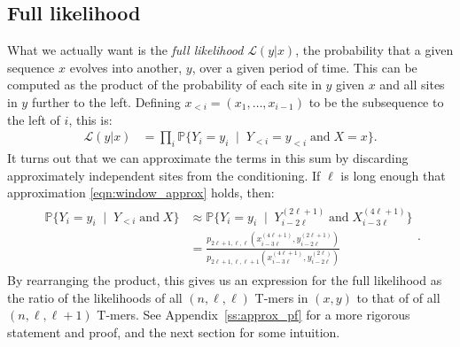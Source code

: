 \documentclass{article}
\renewcommand{\P}{\mathbb{P}}
\newcommand{\calS}{\mathcal{S}}  %
\newcommand{\given}{\;\mid\;}
\newcommand{\like}{\mathcal L}
\theoremstyle{plain}
\theoremstyle{definition}
\begin{document}

\subsection{Full likelihood}

What we actually want is the \emph{full likelihood} $\like(y|x)$,
the probability that a given sequence $x$ evolves into another, $y$, over a given period of time.
This can be computed as the product of the probability of each site in $y$
given $x$ and all sites in $y$ further to the left.
Defining $x_{<i}=(x_1, \ldots, x_{i-1})$ to be the subsequence to the left of $i$, this is:
\begin{align*}
    \like(y|x) &= \prod_i \P\{ Y_i = y_i \given Y_{<i} = y_{<i} \;\text{and}\; X=x \} .
\end{align*}
It turns out that
we can approximate the terms in this sum
by discarding approximately independent sites from the conditioning.
If $\ell$ is long enough that approximation \eqref{eqn:window_approx} holds, then:
\begin{align} \label{eqn:full_approx}
    \begin{split}
    \P\{ Y_i = y_i \given Y_{<i} \;\text{and}\; X \}
    &\approx
        \P\{ Y_i = y_i \given Y_{i-2\ell}^{(2\ell+1)} \;\text{and}\; X_{i-3\ell}^{(4\ell+1)} \}  \\
    &=
        \frac{
            p_{2\ell+1,\ell,\ell}(x_{i-3\ell}^{(4\ell+1)}, y_{i-2\ell}^{(2\ell+1)})
        }{
            p_{2\ell+1,\ell,\ell+1}(x_{i-3\ell}^{(4\ell+1)}, y_{i-2\ell}^{(2\ell)})
        }
    \end{split} .
\end{align}
By rearranging the product,
this gives us an expression for the full likelihood as the ratio of the likelihoods of all $(n,\ell,\ell)$ T-mers in $(x,y)$
to that of of all $(n,\ell,\ell+1)$ T-mers.
See Appendix~\ref{ss:approx_pf} for a more rigorous statement and proof,
and the next section for some intuition.
\end{document}
